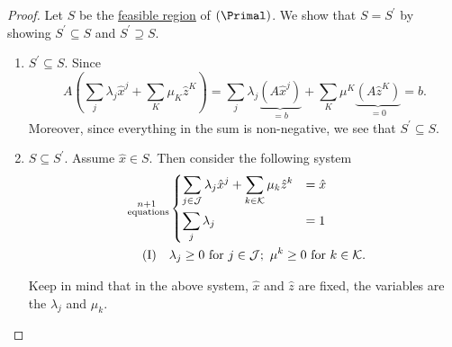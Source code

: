 \begin{proof}
	Let \(S\) be the \hyperref[def:feasible-region]{feasible region} of \((\Primal)\). We show that \(S = S^\prime\) by showing \(S^\prime\subseteq S\) and \(S^\prime\supseteq S\).
	\begin{enumerate}
		\item \(S^\prime\subseteq S\). Since
		      \[
			      A\left(\sum\limits_{j}\lambda_{j}\hat{x}^j + \sum\limits_{K}\mu_K \hat{z}^K \right)= \sum\limits_j \lambda_{j}\underbrace{\left(A \hat{x}^j\right)}_{=b}+\sum\limits_{K} \mu^K \underbrace{\left(A \hat{z}^K\right)}_{=0} = b.
		      \]
		      Moreover, since everything in the sum is non-negative, we see that \(S^\prime\subseteq S\).
		\item \(S\subseteq S^\prime\). Assume \(\hat{x}\in S\). Then consider the following system
		      \[
			      \begin{split}
				      \substack{n+1                                                                                                \\ \text{ equations}}&\begin{dcases}
					      \sum\limits_{j\in\mathcal{J}} \lambda_{j}\hat{x}^j + \sum\limits_{k\in\mathcal{K} } \mu_k \hat{z}^k & = \hat{x} \\
					      \sum\limits_{j}\lambda_{j}                                                                          & = 1       \\
				      \end{dcases}\\
				      (\mathrm{I})\quad & \lambda_{j}\geq 0 \text{ for }j\in\mathcal{J};\ \mu^k\geq 0 \text{ for }k\in\mathcal{K}.
			      \end{split}
		      \]
		      \begin{note}
			      Keep in mind that in the above system, \(\hat{x}\) and \(\hat{z}\) are fixed, the variables are the \(\lambda_{j}\) and \(\mu_k\).
		      \end{note}


\end{enumerate}
\end{proof}
